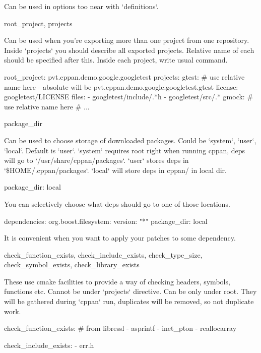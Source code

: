 Can be used in options too near with `definitions`.

root_project, projects

Can be used when you're exporting more than one project from one repository. Inside `projects` you should describe all exported projects. Relative name of each should be specified after this. Inside each project, write usual command.

\begin{cppan}
    root_project: pvt.cppan.demo.google.googletest
      projects:
        gtest: # use relative name here - absolute will be pvt.cppan.demo.google.googletest.gtest
          license: googletest/LICENSE
          files:
            - googletest/include/.*\.h
            - googletest/src/.*
        gmock: # use relative name here
          # ...
\end{cppan}

package_dir

Can be used to choose storage of downloaded packages. Could be `system`, `user`, `local`. Default is `user`. `system` requires root right when running cppan, deps will go to `/usr/share/cppan/packages`. `user` stores deps in `\$HOME/.cppan/packages`. `local` will store deps in cppan/ in local dir.

    package_dir: local

You can selectively choose what deps should go to one of those locations.

\begin{cppan}
    dependencies:
        org.boost.filesystem:
            version: "*"
            package_dir: local
\end{cppan}

It is convenient when you want to apply your patches to some dependency.

check_function_exists, check_include_exists, check_type_size, check_symbol_exists, check_library_exists

These use cmake facilities to provide a way of checking headers, symbols, functions etc. Cannot be under `projects` directive. Can be only under root. They will be gathered during `cppan` run, duplicates will be removed, so not duplicate work.

\begin{cppan}
    check_function_exists: # from libressl
      - asprintf
      - inet_pton
      - reallocarray

    check_include_exists:
      - err.h
\end{cppan}






